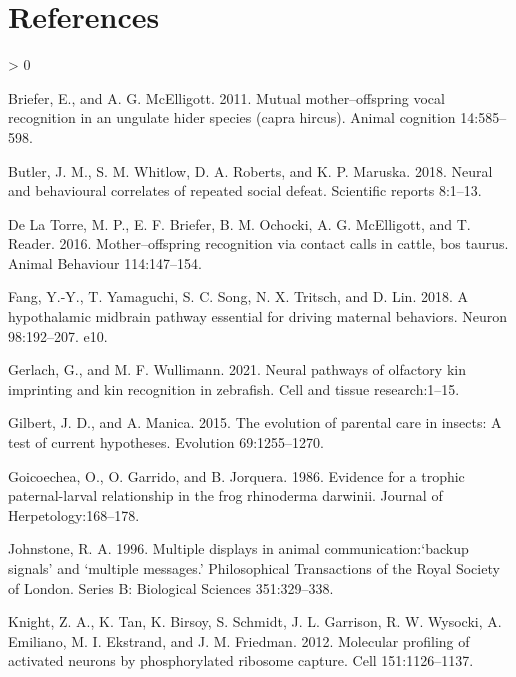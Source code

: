 \documentclass[
  12pt,
]{article}
\newlength{\cslhangindent}
\newenvironment{CSLReferences}[2] %
 {%
  \setlength{\parindent}{0pt}
  \ifodd #1 \everypar{\setlength{\hangindent}{\cslhangindent}}\ignorespaces\fi
  \ifnum #2 > 0
  \setlength{\parskip}{#2\baselineskip}
  \fi
 }%
 {}
\begin{document}
\hypertarget{references}{%
\section*{References}\label{references}}

\hypertarget{refs}{}
\begin{CSLReferences}{1}{0}
\leavevmode\hypertarget{ref-RN8}{}%
Briefer, E., and A. G. McElligott. 2011. Mutual mother--offspring vocal recognition in an ungulate hider species (capra hircus). Animal cognition 14:585--598.

\leavevmode\hypertarget{ref-RN24}{}%
Butler, J. M., S. M. Whitlow, D. A. Roberts, and K. P. Maruska. 2018. Neural and behavioural correlates of repeated social defeat. Scientific reports 8:1--13.

\leavevmode\hypertarget{ref-RN3}{}%
De La Torre, M. P., E. F. Briefer, B. M. Ochocki, A. G. McElligott, and T. Reader. 2016. Mother--offspring recognition via contact calls in cattle, bos taurus. Animal Behaviour 114:147--154.

\leavevmode\hypertarget{ref-RN20}{}%
Fang, Y.-Y., T. Yamaguchi, S. C. Song, N. X. Tritsch, and D. Lin. 2018. A hypothalamic midbrain pathway essential for driving maternal behaviors. Neuron 98:192--207. e10.

\leavevmode\hypertarget{ref-RN30}{}%
Gerlach, G., and M. F. Wullimann. 2021. Neural pathways of olfactory kin imprinting and kin recognition in zebrafish. Cell and tissue research:1--15.

\leavevmode\hypertarget{ref-RN1}{}%
Gilbert, J. D., and A. Manica. 2015. The evolution of parental care in insects: A test of current hypotheses. Evolution 69:1255--1270.

\leavevmode\hypertarget{ref-RN12}{}%
Goicoechea, O., O. Garrido, and B. Jorquera. 1986. Evidence for a trophic paternal-larval relationship in the frog rhinoderma darwinii. Journal of Herpetology:168--178.

\leavevmode\hypertarget{ref-RN6}{}%
Johnstone, R. A. 1996. Multiple displays in animal communication:{`backup signals'} and {`multiple messages.'} Philosophical Transactions of the Royal Society of London. Series B: Biological Sciences 351:329--338.

\leavevmode\hypertarget{ref-RN25}{}%
Knight, Z. A., K. Tan, K. Birsoy, S. Schmidt, J. L. Garrison, R. W. Wysocki, A. Emiliano, M. I. Ekstrand, and J. M. Friedman. 2012. Molecular profiling of activated neurons by phosphorylated ribosome capture. Cell 151:1126--1137.


\end{CSLReferences}
\end{document}
